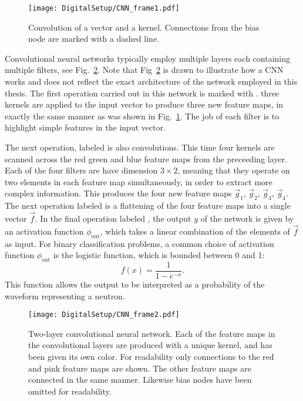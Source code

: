 \documentclass[main.tex]{subfiles}
\begin{document}

\begin{figure}[h!]
    \centering
        \texttt{[image: DigitalSetup/CNN\_frame1.pdf]}
        \caption[Convolution of a vector and a kernel]{Convolution of a vector and a kernel. Connections from the bias node are marked with a dashed line.}
    \label{fig:CNN_frame1} 
\end{figure}

Convolutional neural networks typically employ multiple layers each containing multiple filters, see Fig.~\ref{fig:CNN_frame2}. Note that Fig~\ref{fig:CNN_frame2} is drawn to illustrate how a CNN works and does not reflect the exact architecture of the network employed in this thesis.  The first operation carried out in this network is marked with . three kernels are applied to the input vector to produce three new feature maps, in exactly the same manner as was shown in Fig.~\ref{fig:CNN_frame1}. The job of  each filter is to highlight simple features in the input vector.

The next operation, labeled  is also convolutions. This time four kernels are scanned across the red green and blue feature maps from the preceeding layer. Each of the four filters are have dimension $3\times2$, meaning that they operate on two elements in each feature map simultaneously, in order to extract more complex information. This produces the four new feature maps $\vec g_1$, $\vec g_2$, $\vec g_3$, $\vec g_4$. The next operation labeled  is a flattening of the four feature maps into a single vector $\vec f$. In the final operation labeled , the output $y$ of the network is given by an activation function $\phi_{\textrm{out}}$, which takes a linear combination of the elements of $\vec f$ as input. For binary classification problems, a common choice of activation function $\phi_{\textrm{out}}$ is the logistic function, which is bounded between 0 and 1:
\begin{equation}
	f(x) = \frac{1}{1-e^{-x}}.
\end{equation}
This function allows the output to be interpreted as a probability of the waveform representing a neutron.

\begin{figure}[ht!]
    \centering
        \texttt{[image: DigitalSetup/CNN\_frame2.pdf]}
        \caption[Two-layer convolutional neural network.]{Two-layer convolutional neural network. Each of the feature maps in the convolutional layers are produced with a unique kernel, and has been given its own color. For readability only connections to the red and pink feature maps are shown. The other feature maps are connected in the same manner. Likewise bias nodes have been omitted for readability.}
    \label{fig:CNN_frame2} 
\end{figure}
\end{document}
